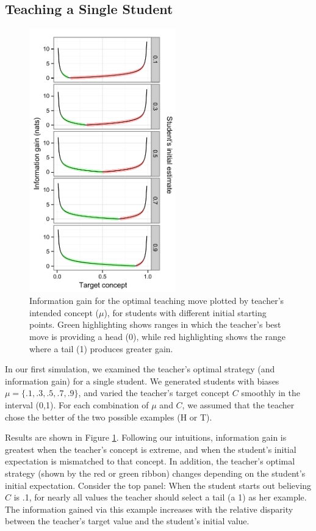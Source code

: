\documentclass[10pt,letterpaper]{article}
\begin{document}
\subsection{Teaching a Single Student}

\begin{figure}[t]
\begin{center}
\includegraphics[width=2.5in]{figures/single_student_gain.pdf}
\end{center}
\caption{\label{fig:student} Information gain for the optimal teaching move plotted by teacher's intended concept ($\mu$), for students with different initial starting points. Green highlighting shows ranges in which the teacher's best move is providing a head (0), while red highlighting shows the range where a tail (1) produces greater gain.}
\end{figure}

In our first simulation, we examined the teacher's optimal strategy (and information gain) for a single student. We generated students with biases $\mu= \{.1, .3, .5, .7, .9\}$, and varied the teacher's target concept $C$ smoothly in the interval (0,1). For each combination of $\mu$ and $C$, we assumed that the teacher chose the better of the two possible examples (H or T). 

Results are shown in Figure \ref{fig:student}. Following our intuitions, information gain is greatest when the teacher's concept is extreme, and when the student's initial expectation is mismatched to that concept. In addition, the teacher's optimal strategy (shown by the red or green ribbon) changes depending on the student's initial expectation. Consider the top panel: When the student starts out believing $C$ is .1, for nearly all values the teacher should select a tail (a 1) as her example. The information gained via this example increases with the relative disparity between the teacher's target value and the student's initial value.
\end{document}
